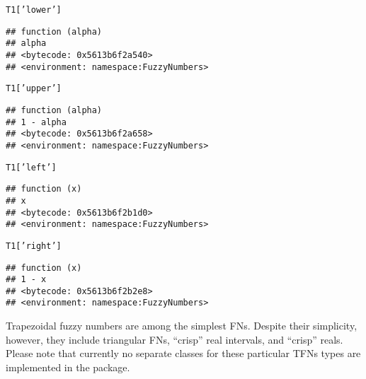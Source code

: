 \documentclass[11pt]{article}\usepackage[]{graphicx}\usepackage[]{color}
\makeatletter
\newcommand{\hlstr}[1]{\textcolor[rgb]{0.192,0.494,0.8}{#1}}%
\newcommand{\hlstd}[1]{\textcolor[rgb]{0.345,0.345,0.345}{#1}}%
\newenvironment{kframe}{%
 \def\at@end@of@kframe{}%
 \ifinner\ifhmode%
  \def\at@end@of@kframe{\end{minipage}}%
  \begin{minipage}{\columnwidth}%
 \fi\fi%
 \def\FrameCommand##1{\hskip\@totalleftmargin \hskip-\fboxsep
 \colorbox{shadecolor}{##1}\hskip-\fboxsep
     \hskip-\linewidth \hskip-\@totalleftmargin \hskip\columnwidth}%
 \MakeFramed {\advance\hsize-\width
   \@totalleftmargin\z@ \linewidth\hsize
   \@setminipage}}%
 {\par\unskip\endMakeFramed%
 \at@end@of@kframe}
\newenvironment{knitrout}{}{} %
\makeatother
\begin{document}
\begin{knitrout}\small
{}\color{fgcolor}\begin{kframe}
\begin{alltt}
\hlstd{T1[}\hlstr{'lower'}\hlstd{]}
\end{alltt}
\begin{verbatim}
## function (alpha) 
## alpha
## <bytecode: 0x5613b6f2a540>
## <environment: namespace:FuzzyNumbers>
\end{verbatim}
\begin{alltt}
\hlstd{T1[}\hlstr{'upper'}\hlstd{]}
\end{alltt}
\begin{verbatim}
## function (alpha) 
## 1 - alpha
## <bytecode: 0x5613b6f2a658>
## <environment: namespace:FuzzyNumbers>
\end{verbatim}
\begin{alltt}
\hlstd{T1[}\hlstr{'left'}\hlstd{]}
\end{alltt}
\begin{verbatim}
## function (x) 
## x
## <bytecode: 0x5613b6f2b1d0>
## <environment: namespace:FuzzyNumbers>
\end{verbatim}
\begin{alltt}
\hlstd{T1[}\hlstr{'right'}\hlstd{]}
\end{alltt}
\begin{verbatim}
## function (x) 
## 1 - x
## <bytecode: 0x5613b6f2b2e8>
## <environment: namespace:FuzzyNumbers>
\end{verbatim}
\end{kframe}
\end{knitrout}



\bigskip
Trapezoidal fuzzy numbers are among the simplest FNs.
Despite their simplicity, however, they include triangular FNs,
``crisp'' real intervals, and ``crisp'' reals.
Please note that currently no separate classes for these particular TFNs types
are implemented in the package.
\end{document}
